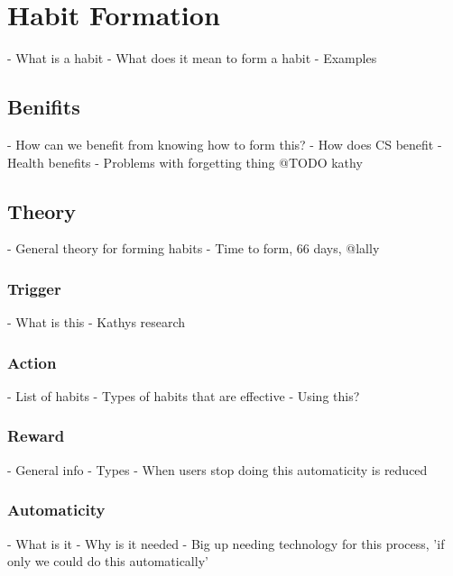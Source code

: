 \newpage


\section{Habit Formation}
  - What is a habit\newline
  - What does it mean to form a habit\newline
    - Examples\newline
  \subsection{Benifits}
    - How can we benefit from knowing how to form this?\newline
    - How does CS benefit\newline
      - Health benefits\newline
      - Problems with forgetting thing @TODO kathy
  \subsection{Theory}
    - General theory for forming habits\newline
    - Time to form, 66 days, @lally
  \subsubsection{Trigger}
      - What is this\newline
      - Kathys research
  \subsubsection{Action}
      - List of habits\newline
      - Types of habits that are effective\newline
        - Using this?
  \subsubsection{Reward}
      - General info\newline
      - Types\newline
    - When users stop doing this automaticity is reduced
  \subsubsection{Automaticity}
      - What is it\newline
      - Why is it needed\newline
    - Big up needing technology for this process, 'if only we could do this automatically'
